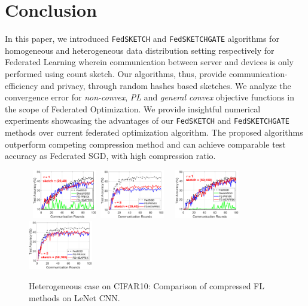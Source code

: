 \documentclass[sigconf, anonymous, review]{acmart}
\begin{document}
\section{Conclusion}


In this paper, we introduced \texttt{FedSKETCH} and \texttt{FedSKETCHGATE} algorithms for homogeneous and heterogeneous data distribution setting respectively for Federated Learning wherein communication between server and devices is only performed using count sketch. 
Our algorithms, thus, provide communication-efficiency and privacy, through random hashes based sketches. 
We analyze the convergence error for \emph{non-convex}, \emph{PL} and \emph{general convex} objective functions in the scope of Federated Optimization.  
We provide insightful numerical experiments showcasing the advantages of our \texttt{FedSKETCH} and \texttt{FedSKETCHGATE} methods over current federated optimization algorithm. The proposed algorithms outperform competing compression method and can achieve comparable test accuracy as Federated SGD, with high compression ratio.



\begin{figure}[t]
	\begin{center}
		\mbox{%
\includegraphics[width=0.25\textwidth]{CIFAR_figures/cifar_local1_sketch20_iid0_test_acc.eps} 
		\includegraphics[width=0.25\textwidth]{CIFAR_figures/cifar_local5_sketch20_iid0_test_acc.eps}
		}
		\mbox{%
		\includegraphics[width=0.25\textwidth]{CIFAR_figures/cifar_local1_sketch50_iid0_test_acc.eps}
		\includegraphics[width=0.25\textwidth]{CIFAR_figures/cifar_local5_sketch50_iid0_test_acc.eps}
		}
	\end{center}
	\caption{Heterogeneous case on CIFAR10: Comparison of compressed FL methods on LeNet CNN.}
    \label{fig:CIFAR-heter}
\end{figure}
\end{document}
